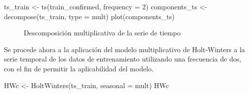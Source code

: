 \documentclass[
  letterpaper,
  DIV=11,
  numbers=noendperiod]{scrreport}
\newenvironment{Shaded}{\begin{snugshade}}{\end{snugshade}}
\newcommand{\AttributeTok}[1]{\textcolor[rgb]{0.40,0.45,0.13}{#1}}
\newcommand{\DecValTok}[1]{\textcolor[rgb]{0.68,0.00,0.00}{#1}}
\newcommand{\FunctionTok}[1]{\textcolor[rgb]{0.28,0.35,0.67}{#1}}
\newcommand{\NormalTok}[1]{\textcolor[rgb]{0.00,0.23,0.31}{#1}}
\newcommand{\OtherTok}[1]{\textcolor[rgb]{0.00,0.23,0.31}{#1}}
\newcommand{\StringTok}[1]{\textcolor[rgb]{0.13,0.47,0.30}{#1}}
\theoremstyle{plain}
\theoremstyle{definition}
\theoremstyle{definition}
\theoremstyle{plain}
\theoremstyle{remark}
\begin{document}
\begin{Shaded}
\begin{Highlighting}[]
\NormalTok{ts\_train }\OtherTok{\textless{}{-}} \FunctionTok{ts}\NormalTok{(train\_confirmed, }\AttributeTok{frequency =} \DecValTok{2}\NormalTok{)}
\NormalTok{components\_ts }\OtherTok{\textless{}{-}} \FunctionTok{decompose}\NormalTok{(ts\_train, }\AttributeTok{type =} \StringTok{\textquotesingle{}mult\textquotesingle{}}\NormalTok{)}
\FunctionTok{plot}\NormalTok{(components\_ts)}
\end{Highlighting}
\end{Shaded}

\begin{figure}


\caption{\label{fig-descomp}Descomposición multiplicativa de la serie de
tiempo}

\end{figure}%

Se procede ahora a la aplicación del modelo multiplicativo de
Holt-Winters a la serie temporal de los datos de entrenamiento
utilizando una frecuencia de dos, con el fin de permitir la
aplicabilidad del modelo.

\begin{Shaded}
\begin{Highlighting}[]
\NormalTok{HWc }\OtherTok{\textless{}{-}} \FunctionTok{HoltWinters}\NormalTok{(ts\_train, }\AttributeTok{seasonal =} \StringTok{\textquotesingle{}mult\textquotesingle{}}\NormalTok{)}
\NormalTok{HWc}
\end{Highlighting}
\end{Shaded}
\end{document}
